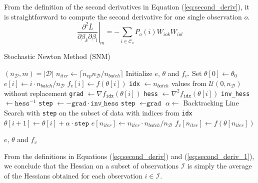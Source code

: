 \documentclass[conference]{IEEEtran}
\let\oldReturn\Return
\renewcommand{\Return}{\State\oldReturn}
\begin{document}
From the definition of the second derivatives in Equation (\ref{eq:second_deriv}), it is straightforward to compute the second derivative for one single observation $o$.
\begin{equation}
\label{eq:second_deriv_1}
\left.\frac{\partial^2 \bar{L}}{\partial \beta_k \partial \beta_l}\right|_{m} = - \sum_{i\in\mathcal{C}_o} P_o(i) W_{iok} W_{iol}
\end{equation}

\begin{algorithm*}[t]
\caption{Stochastic Newton Method (SNM)}\label{algo:snm}
\begin{algorithmic}[1]
\State $(n_{\mathcal{D}}, m) = |\mathcal{D}|$ 
\State $n_{iter} \gets \lceil n_{ep}n_{\mathcal{D}}/n_{batch} \rceil$ 
\State Initialize $e$, $\theta$ and $f_v$. Set $\theta[0] \gets \theta_{0}$
\State $e[i] \gets i\cdot n_{batch} /n_{\mathcal{D}}$ 
\State $f_{v}[i] \gets f(\theta[i])$ 
\State \texttt{idx} $\gets n_{batch} $ values from $\mathcal{U}(0, n_{\mathcal{D}})$ without replacement
\State \texttt{grad} $\gets \nabla f_{\texttt{idx}}(\theta[i])$ 
\State \texttt{hess} $\gets \nabla^2 f_{\texttt{idx}}(\theta[i])$ 
\State \texttt{inv\_hess} $\gets \texttt{hess}^{-1}$
\State \texttt{step} $\gets -\texttt{grad} \cdot \texttt{inv\_hess}$
\Else 
\State \texttt{step} $\gets \texttt{grad}$
\EndIf
\State $\alpha \gets $ Backtracking Line Search with \texttt{step} on the subset of data  with indices from \texttt{idx}
\State $\theta[i+1] \gets \theta[i] + \alpha \cdot \texttt{step}$
\EndFor
\State $e[n_{iter}] \gets n_{iter}\cdot n_{batch} /n_{\mathcal{D}}$
\State $f_{v}[n_{iter}] \gets f(\theta[n_{iter}])$

\Return $e$, $\theta$ and $f_v$
\EndFunction
\end{algorithmic}
\end{algorithm*}

From the definitions in Equations (\ref{eq:second_deriv}) and (\ref{eq:second_deriv_1}), we conclude that the Hessian on a subset of observations $\mathcal{I}$ is simply the average of the Hessians obtained for each observation $i\in\mathcal{I}$. 
\end{document}
